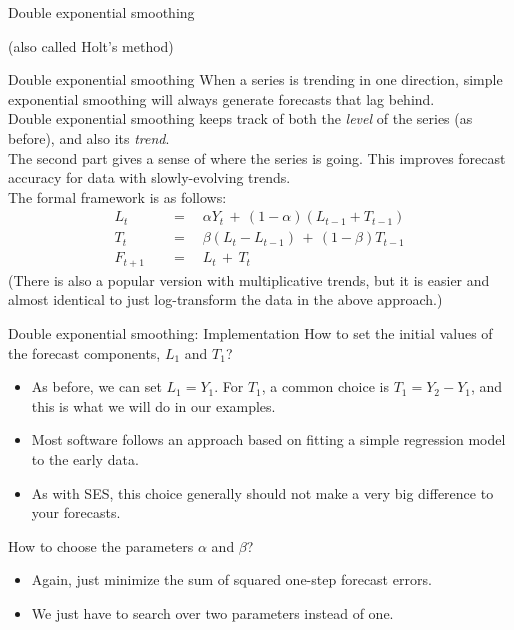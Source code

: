 \documentclass[t,12pt]{beamer}
\begin{document}
	\begin{frame}[c]
	\vfill
	\centerline{Double exponential smoothing}
	\centerline{(also called Holt's method)}
	\vfill
	\end{frame}

	\begin{frame}[c]{Double exponential smoothing}
	When a series is trending in one direction, simple exponential smoothing will always generate forecasts that lag behind.
	\\ \medskip
	Double exponential smoothing keeps track of both the \emph{level} of the series (as before), and also its \emph{trend}.
	\\ \medskip
	The second part gives a sense of where the series is going.
	This improves forecast accuracy for data with slowly-evolving trends.
	\\ \medskip
	The formal framework is as follows:
	\begin{align*}
	L_t \quad &= \quad \alpha Y_t \, + \, (1-\alpha)(L_{t-1} + T_{t-1})
	\\
	T_t \quad &= \quad \beta (L_t - L_{t-1}) \, + \, (1-\beta) T_{t-1}
	\\
	F_{t+1} \quad &= \quad L_t \, + \, T_t
	\end{align*}
	{\footnotesize (There is also a popular version with multiplicative trends, but it is easier and almost identical to just log-transform the data in the above approach.)}
	\end{frame}

	\begin{frame}[c]{Double exponential smoothing: Implementation}
	How to set the initial values of the forecast components, $L_1$ and $T_1$?
	\begin{itemize}
	\item As before, we can set $L_1 = Y_1$. 
	For $T_1$, a common choice is $T_1 = Y_2 - Y_1$, and this is what we will do in our examples. 
	\item Most software follows an approach based on fitting a simple regression model to the early data.
	\item As with SES, this choice generally should not make a very big difference to your forecasts.
	\end{itemize}
	\medskip
	How to choose the parameters $\alpha$ and $\beta$?
	\begin{itemize}
	\item Again, just minimize the sum of squared one-step forecast errors.
	\item We just have to search over two parameters instead of one.
	\end{itemize}
	\end{frame}
\end{document}
